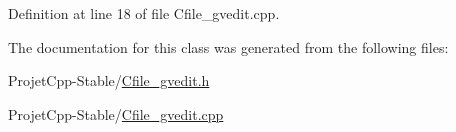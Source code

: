 Definition at line 18 of file Cfile\+\_\+gvedit.\+cpp.



The documentation for this class was generated from the following files\+:\begin{DoxyCompactItemize}
\item 
Projet\+Cpp-\/\+Stable/\hyperlink{_cfile__gvedit_8h}{Cfile\+\_\+gvedit.\+h}\item 
Projet\+Cpp-\/\+Stable/\hyperlink{_cfile__gvedit_8cpp}{Cfile\+\_\+gvedit.\+cpp}\end{DoxyCompactItemize}
